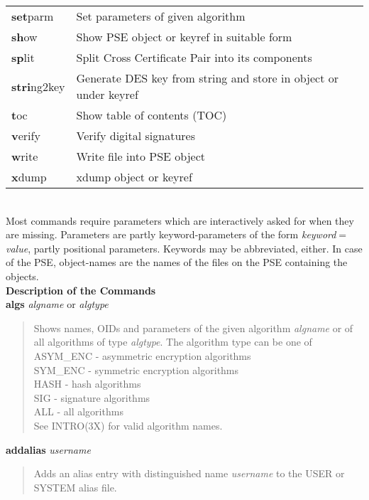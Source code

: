 \begin{tabular}{ll}
{\bf set}parm      & Set parameters of given algorithm                                 \\
{\bf sh}ow         & Show PSE object or keyref in suitable form                        \\
{\bf sp}lit        & Split Cross Certificate Pair into its components                  \\
{\bf stri}ng2key   & Generate DES key from string and store in object or under keyref  \\
{\bf t}oc          & Show table of contents (TOC)                                      \\
{\bf v}erify       & Verify digital signatures                                         \\
{\bf w}rite        & Write file into PSE object                                        \\
{\bf x}dump        & xdump object or keyref                                            \\
\end{tabular} \\ [1em]
Most commands require parameters which are interactively asked for when they are missing. 
Parameters are partly keyword-parameters of the form {\em keyword$=$value}, partly positional 
parameters. Keywords
may be abbreviated, either. In case of the PSE, object-names are the names of 
the files on the PSE containing the objects.
\\ [1em]
{\bf Description of the Commands} 
\\ [1em]
{\bf algs} {\em algname} or {\em algtype}
\begin{quote}
Shows names, OIDs and parameters of the given algorithm {\em algname} or of all algorithms
of type {\em algtype}. The algorithm type can be one of
\bvtab
\1 ASYM\_ENC \3 - asymmetric encryption algorithms \\
\1 SYM\_ENC  \3 - symmetric encryption algorithms \\
\1 HASH      \3 - hash algorithms \\
\1 SIG       \3 - signature algorithms \\
\1 ALL       \3 - all algorithms \\
\evtab
See INTRO(3X) for valid algorithm names.
\end{quote}

{\bf addalias} {\em username}
\begin{quote}
Adds an alias entry with distinguished name {\em username} to the USER or SYSTEM alias file.
\end{quote}

